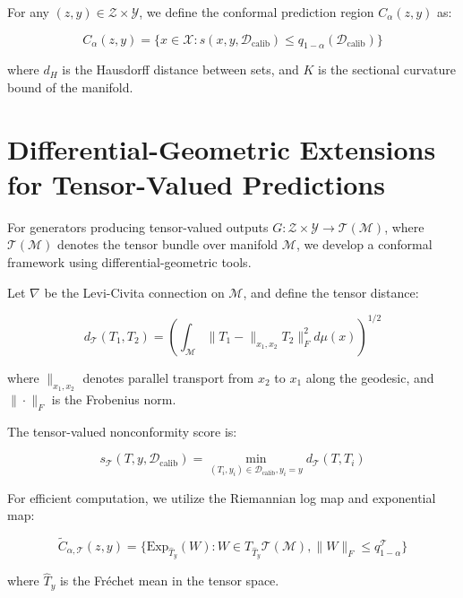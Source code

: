 \documentclass{article}
\theoremstyle{plain}
\theoremstyle{definition}
\theoremstyle{remark}
\begin{document}
For any $(z, y) \in \mathcal{Z} \times \mathcal{Y}$, we define the conformal prediction region $C_{\alpha}(z, y)$ as:

\begin{equation}
C_{\alpha}(z, y) = \{x \in \mathcal{X}: s(x, y, \mathcal{D}_{\text{calib}}) \leq q_{1-\alpha}(\mathcal{D}_{\text{calib}})\}
\end{equation}

where $d_H$ is the Hausdorff distance between sets, and $K$ is the sectional curvature bound of the manifold.

\section{Differential-Geometric Extensions for Tensor-Valued Predictions}

For generators producing tensor-valued outputs $G: \mathcal{Z} \times \mathcal{Y} \rightarrow \mathcal{T}(\mathcal{M})$, where $\mathcal{T}(\mathcal{M})$ denotes the tensor bundle over manifold $\mathcal{M}$, we develop a conformal framework using differential-geometric tools.

Let $\nabla$ be the Levi-Civita connection on $\mathcal{M}$, and define the tensor distance:

\begin{equation}
d_{\mathcal{T}}(T_1, T_2) = \left( \int_{\mathcal{M}} \|T_1 - \parallel_{x_1, x_2} T_2\|_F^2 d\mu(x) \right)^{1/2}
\end{equation}

where $\parallel_{x_1, x_2}$ denotes parallel transport from $x_2$ to $x_1$ along the geodesic, and $\|\cdot\|_F$ is the Frobenius norm.

The tensor-valued nonconformity score is:

\begin{equation}
s_{\mathcal{T}}(T, y, \mathcal{D}_{\text{calib}}) = \min_{(T_i, y_i) \in \mathcal{D}_{\text{calib}}, y_i = y} d_{\mathcal{T}}(T, T_i)
\end{equation}

For efficient computation, we utilize the Riemannian log map and exponential map:

\begin{equation}
\tilde{C}_{\alpha, \mathcal{T}}(z, y) = \{\text{Exp}_{\hat{T}_y}(W) : W \in T_{\hat{T}_y}\mathcal{T}(\mathcal{M}), \|W\|_F \leq q_{1-\alpha}^{\mathcal{T}}\}
\end{equation}

where $\hat{T}_y$ is the Fréchet mean in the tensor space.
\end{document}
